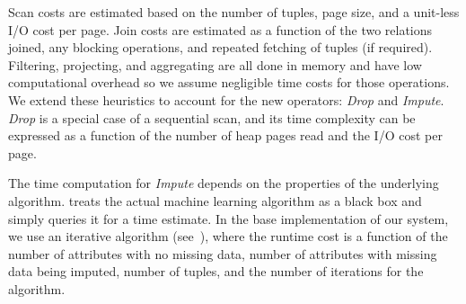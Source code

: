 
Scan costs are estimated based on the number of tuples, 
page size, and a unit-less I/O cost per page. Join costs are estimated as a function
of the two relations joined, any blocking operations, and repeated fetching of tuples (if required).
Filtering, projecting, and aggregating are all done in memory and have low computational overhead
so we assume negligible time costs for those operations. We extend these heuristics to 
account for the new operators: \textit{Drop} and \textit{Impute}. \textit{Drop} is a special case of a sequential scan, and its time
complexity can be expressed as a function of the number of heap pages read and the I/O cost
per page.

The time computation for \textit{Impute} depends on the properties of the underlying
algorithm. \ProjectName{} treats the actual machine learning algorithm as a black box
and simply queries it for a time estimate. In the base implementation of our system,
we use an iterative algorithm (see~), where the runtime cost
is a function of the number of attributes with no missing data, number of attributes with
missing data being imputed, number of tuples, and the number of iterations for the algorithm.

